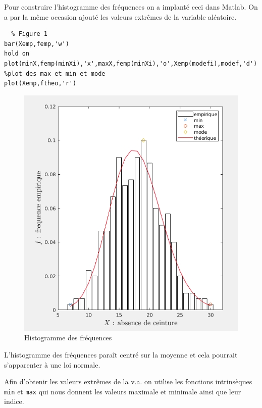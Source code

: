 \documentclass[a4paper,oneside]{article}
\makeatletter
\def\bigcenter{\trivlist \bigcentering\item\relax}
\def\bigcentering{\let\\\@centercr\rightskip\@bigflushglue%
\leftskip\@bigflushglue
\parindent\z@\parfillskip\z@skip}
\makeatother
\begin{document}
\begin{enumerate}
  \item

  Pour construire l'histogramme des fréquences on a implanté ceci dans Matlab.
  On a par la même occasion ajouté les valeurs extrêmes de la variable aléatoire.

\begin{lstlisting}
  % Figure 1
bar(Xemp,femp,'w')
hold on
plot(minX,femp(minXi),'x',maxX,femp(minXi),'o',Xemp(modefi),modef,'d') %plot des max et min et mode
plot(Xemp,ftheo,'r')
\end{lstlisting}


  \begin{figure}[h!]
  \bigcenter
  \includegraphics[scale=0.8]{fig_1_sub1.png}
  \caption{Histogramme des fréquences}
  \end{figure}


L'histogramme des fréquences paraît centré sur la moyenne et cela pourrait s'apparenter à une loi normale.

\clearpage

\item Afin d'obtenir les valeurs extrêmes de la v.a. on utilise les fonctions intrinsèques \verb?min? et \verb?max? qui nous donnent les valeurs maximale et minimale ainsi que leur indice.


\end{enumerate}
\end{document}
